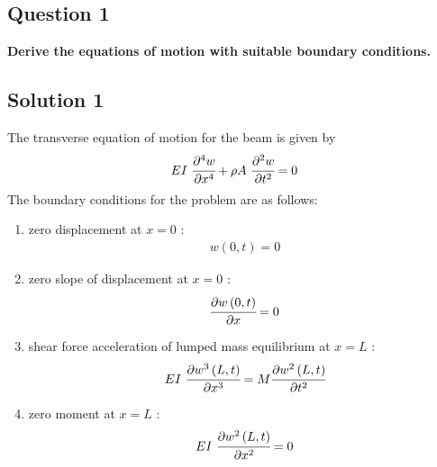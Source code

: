 \documentclass[]{report}
\begin{document}
\subsection*{Question 1}
\textbf{Derive the equations of motion with suitable boundary conditions.}
\begin{center}
\subsection*{Solution 1}
\end{center}
The transverse equation of motion for the beam is given by
\begin{eqnarray*}
 EI~\cfrac{\partial^4 w}{\partial x^4} + \rho A~\cfrac{\partial^2 w}{\partial t^2} = 0
\end{eqnarray*}
The boundary conditions for the problem are as follows:\\
\begin{enumerate}
\item {zero displacement at $x=0$ :\\ \begin{eqnarray*}
w\left(0,t\right)=0
\end{eqnarray*} }
\item {zero slope of displacement at $x=0$ :\\ \begin{eqnarray*}
\cfrac{\partial w\left(0,t\right)}{\partial x}=0
\end{eqnarray*} }
\item {shear force acceleration of lumped mass equilibrium at $x=L$ :\\ \begin{eqnarray*}
 EI~\cfrac{\partial w^3\left(L,t\right)}{\partial x^3}=M\cfrac{\partial w^2\left(L,t\right)}{\partial t^2}
\end{eqnarray*} }
\item {zero moment at $x=L$ :\\ \begin{eqnarray*}
 EI~\cfrac{\partial w^2\left(L,t\right)}{\partial x^2}=0
\end{eqnarray*} }
\end{enumerate}
\end{document}
